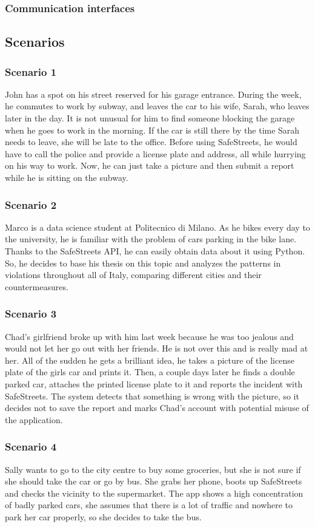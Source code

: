 \subsubsection{Communication interfaces}

\subsection{Scenarios}
\subsubsection{Scenario 1}
John has a spot on his street reserved for his garage entrance. During the week, he commutes to work by subway, and leaves the car to his wife, Sarah, who leaves later in the day. It is not unusual for him to find someone blocking the garage when he goes to work in the morning. If the car is still there by the time Sarah needs to leave, she will be late to the office. 
Before using SafeStreets, he would have to call the police and provide a license plate and address, all while hurrying on his way to work. Now, he can just take a picture and then submit a report while he is sitting on the subway.
\subsubsection{Scenario 2}
Marco is a data science student at Politecnico di Milano. As he bikes every day to the university, he is familiar with the problem of cars parking in the bike lane. Thanks to the SafeStreets API, he can easily obtain data about it using Python. So, he decides to base his thesis on this topic and analyzes the patterns in violations throughout all of Italy, comparing different cities and their countermeasures.
\subsubsection{Scenario 3}
Chad’s girlfriend broke up with him last week because he was too jealous and would not let her go out with her friends. He is not over this and is really mad at her. All of the sudden he gets a brilliant idea, he takes a picture of the license plate of the girls car and prints it. Then, a couple days later he finds a double parked car, attaches the printed license plate to it and reports the incident with SafeStreets. 
The system detects that something is wrong with the picture, so it decides not to save the report and marks Chad’s account with potential misuse of the application.
\subsubsection{Scenario 4}
Sally wants to go to the city centre to buy some groceries, but she is not sure if she should take the car or go by bus. She grabs her phone, boots up SafeStreets and checks the vicinity to the supermarket. The app shows a high concentration of badly parked cars, she assumes that there is a lot of traffic and nowhere to park her car properly, so she decides to take the bus.

